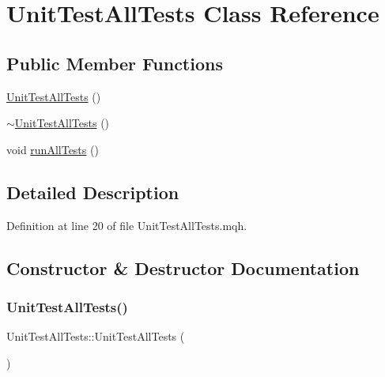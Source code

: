 \hypertarget{class_unit_test_all_tests}{}\section{Unit\+Test\+All\+Tests Class Reference}
\label{class_unit_test_all_tests}
\subsection*{Public Member Functions}
\begin{DoxyCompactItemize}
\item 
\mbox{\hyperlink{class_unit_test_all_tests_a353215ac4276ad3e38ddfa736a7a12cf}{Unit\+Test\+All\+Tests}} ()
\item 
\mbox{\hyperlink{class_unit_test_all_tests_a0d8b99f5e3a4c6c88c97a33c6aa730f1}{$\sim$\+Unit\+Test\+All\+Tests}} ()
\item 
void \mbox{\hyperlink{class_unit_test_all_tests_aa68ce4d1bc5a5a49fcfe1ee1e50f2c5e}{run\+All\+Tests}} ()
\end{DoxyCompactItemize}


\subsection{Detailed Description}


Definition at line 20 of file Unit\+Test\+All\+Tests.\+mqh.



\subsection{Constructor \& Destructor Documentation}
\mbox{\label{class_unit_test_all_tests_a353215ac4276ad3e38ddfa736a7a12cf}} 
\subsubsection{\texorpdfstring{Unit\+Test\+All\+Tests()}{UnitTestAllTests()}}
{\footnotesize\ttfamily Unit\+Test\+All\+Tests\+::\+Unit\+Test\+All\+Tests (\begin{DoxyParamCaption}{ }\end{DoxyParamCaption})\hspace{0.3cm}{\ttfamily [inline]}}



